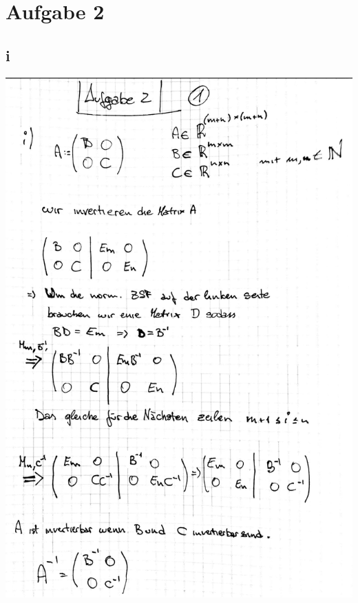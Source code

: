 \documentclass[12pt,a4paper]{article}
\begin{document}
\newpage
\section{Aufgabe 2}
\subsection{i}
\includegraphics[scale=0.2]{lat4c_1.jpg} 

\newpage
\end{document}
